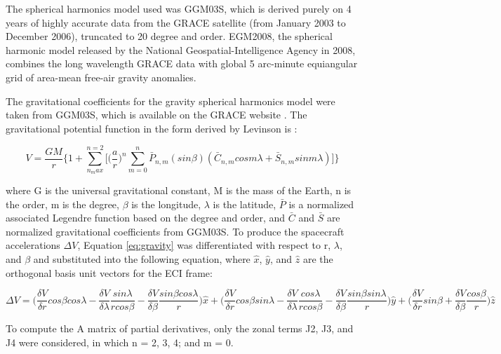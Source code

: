 \documentclass[conf]{new-aiaa}
\begin{document}
The spherical harmonics model used was GGM03S, which is derived purely on 4 years of highly accurate data from the GRACE satellite (from January 2003 to December 2006), truncated to 20 degree and order. EGM2008, the spherical harmonic model released by the National Geospatial-Intelligence Agency in 2008, combines the long wavelength GRACE data with global 5 arc-minute equiangular grid of area-mean free-air gravity anomalies. 

The gravitational coefficients for the gravity spherical harmonics model were taken from GGM03S, which is available on the GRACE website \cite{GRACE}. The gravitational potential function in the form derived by Levinson is \cite{levinson_gravity}: 

\begin{equation}
	V = \dfrac{GM}{r} \Bigg\{ 1 + \sum_{n_max}^{n=2} \bigg[ 
	\bigg( \frac{a}{r} \bigg)^n \sum_{m=0}^{n} \bar{P}_{n,m}(sin \beta) ( \bar{C}_{n,m} cos m \lambda + \bar{S}_{n,m} sin m \lambda )
	 \bigg] \Bigg\}
\end{equation}
\label{eq:gravity}

where G is the universal gravitational constant, M is the mass of the Earth, n is the order, m is the degree, $\beta$ is the longitude, $\lambda$ is the latitude, $\bar{P}$ is a normalized associated Legendre function based on the degree and order, and $\bar{C}$ and $\bar{S}$ are normalized gravitational coefficients from GGM03S. To produce the spacecraft accelerations $\Delta V$, Equation \ref{eq:gravity} was differentiated with respect to r, $\lambda$, and $\beta$ and substituted into the following equation, where $\hat{x}$, $\hat{y}$, and $\hat{z}$ are the orthogonal basis unit vectors for the ECI frame: 

\begin{equation}
	\Delta V = 
	\bigg( \dfrac{\delta V}{\delta r} cos \beta cos \lambda - \dfrac{\delta V}{\delta \lambda} \dfrac{sin \lambda}{ r cos \beta } - \dfrac{\delta V}{\delta \beta } \dfrac{sin \beta cos \lambda }{r } \bigg) \hat{x} + 
	\bigg( \dfrac{\delta V}{\delta r} cos \beta sin \lambda - \dfrac{\delta V}{\delta \lambda} \dfrac{cos \lambda}{ r cos \beta } - \dfrac{\delta V}{\delta \beta } \dfrac{sin \beta sin \lambda }{r } \bigg) \hat{y} + 
	\bigg( \dfrac{\delta V}{\delta r} sin \beta + \dfrac{\delta V}{\delta \beta} \dfrac{cos \beta}{r} \bigg) \hat{z} 	
\end{equation} 

To compute the A matrix of partial derivatives, only the zonal terms J2, J3, and J4 were considered, in which n = 2, 3, 4; and m = 0. 
\end{document}
